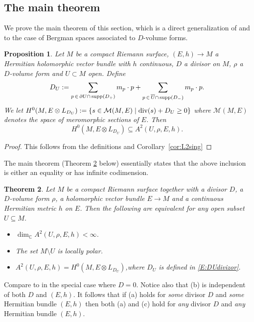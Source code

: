\documentclass[11pt]{amsart}
\newtheorem{theorem}{Theorem}[section]
\newtheorem{prop}[theorem]{Proposition}
\theoremstyle{definition}
\newcommand{\bC}{{\mathbb C}}
\newcommand{\ra}{\rightarrow}
\begin{document}
\subsection{The main theorem} We prove the main theorem of this section, which is a direct generalization of \cite{Sz22} and \cite{GGV22} to the case of Bergman spaces associated to $D$-volume forms.


\begin{prop}\label{prop:merom-az-L2}
 Let $M$ be a compact Riemann surface, $(E,h)\rightarrow M$ a Hermitian holomorphic vector bundle with $h$ continuous, $D$ a divisor on $M$, $\rho$ a $D$-volume form and $U\subset M$ open. Define\begin{equation}\label{E:DUdivizor}   
     D_U := \sum_{p \, \in \, \partial U\cap\,\text{\normalfont supp}(D_+)}m_p\cdot p + \sum_{p\, \in \, \overline{U}\cap\, \text{\normalfont supp}(D_-)}m_p\cdot p.
      \end{equation}
We let $H^0(M,E\otimes L_{D_U}):=\{s\in \mathcal M(M,E)\mid \text{\rm div}(s)+D_{U}\ge 0\}$ where $\mathcal{M}(M,E)$ denotes the space of meromorphic sections of $E$. Then
$$H^0(M,E\otimes L_{D_U}) \subseteq A^2(U,\rho,E,h).$$ 
\end{prop}
\begin{proof}
    This follows from the definitions and Corollary~\ref{cor:L2sing}
\end{proof}

\noindent The main theorem (Theorem \ref{thm:gyokos} below) essentially states that the above inclusion is either an equality or has infinite codimension.

\begin{theorem} \label{thm:gyokos}
 Let $M$ be a compact Riemann surface together with a divisor $D$, a $D$-volume form $\rho$, a holomorphic vector bundle $E\ra M$ and a continuous Hermitian metric $h$ on $E$. Then the following are equivalent for any open subset $U \subseteq M$.
    \begin{itemize}
        \item[(a)] $\dim_\bC A^2(U,\rho, E, h) < \infty$.
        \item[(b)] The set $M\setminus U$ is locally polar.
        \item[(c)] $A^2(U,\rho, E, h) = H^0(M,E\otimes L_{D_U})$,\quad where $D_U$ is defined in \eqref{E:DUdivizor}.
    \end{itemize}
\end{theorem}

\noindent Compare to \cite{Sz22,GGV22,GGV24} in the special case where $D=0$. Notice also that (b) is independent of both $D$ and $(E,h)$. It follows that if (a) holds for \emph{some} divisor $D$ and \emph{some} Hermitian bundle $(E,h)$ then both (a) and (c) hold for \emph{any} divisor $D$ and \emph{any} Hermitian bundle $(E,h)$.
\end{document}
